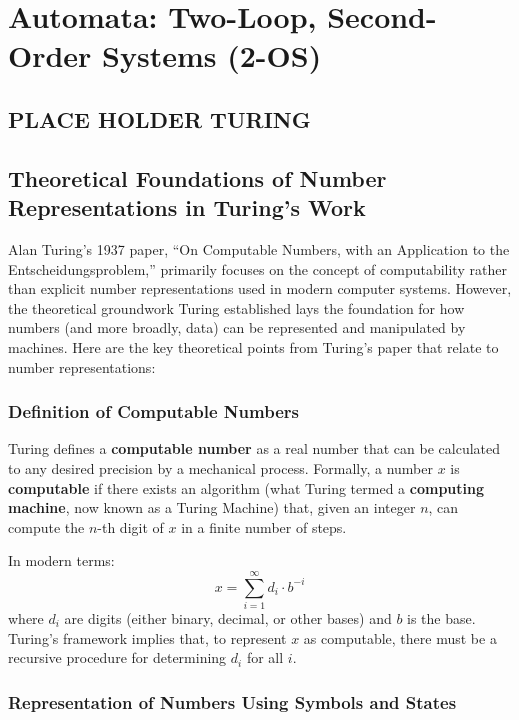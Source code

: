 \chapter{Automata: Two-Loop, Second-Order Systems (2-OS)}\label{lect3}





\section{PLACE HOLDER TURING}
\section{Theoretical Foundations of Number Representations in Turing's Work}

Alan Turing’s 1937 paper, “On Computable Numbers, with an Application to the Entscheidungsproblem,” primarily focuses on the concept of computability rather than explicit number representations used in modern computer systems. However, the theoretical groundwork Turing established lays the foundation for how numbers (and more broadly, data) can be represented and manipulated by machines. Here are the key theoretical points from Turing's paper that relate to number representations:

\subsection{Definition of Computable Numbers}

Turing defines a \textbf{computable number} as a real number that can be calculated to any desired precision by a mechanical process. Formally, a number \( x \) is \textbf{computable} if there exists an algorithm (what Turing termed a \textbf{computing machine}, now known as a Turing Machine) that, given an integer \( n \), can compute the \( n \)-th digit of \( x \) in a finite number of steps.

In modern terms:
\[
x = \sum_{i=1}^{\infty} d_i \cdot b^{-i}
\]
where \( d_i \) are digits (either binary, decimal, or other bases) and \( b \) is the base. Turing’s framework implies that, to represent \( x \) as computable, there must be a recursive procedure for determining \( d_i \) for all \( i \).

\subsection{Representation of Numbers Using Symbols and States}

